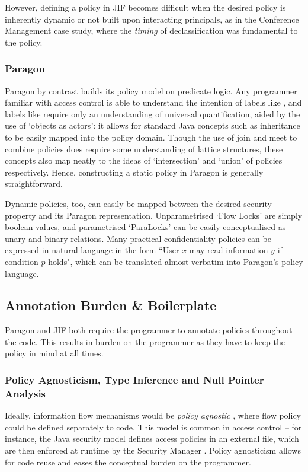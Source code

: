 However, defining a policy in JIF becomes difficult when the desired policy is inherently dynamic or not built upon interacting principals, as in the Conference Management case study, where the \textit{timing} of declassification was fundamental to the policy.

\subsubsection{Paragon}

Paragon by contrast builds its policy model on predicate logic. Any programmer familiar with access control is able to understand the intention of labels like , and labels like  require only an understanding of universal quantification, aided by the use of `objects as actors': it allows for standard Java concepts such as inheritance to be easily mapped into the policy domain. Though the use of join and meet to combine policies does require some understanding of lattice structures, these concepts also map neatly to the ideas of `intersection' and `union' of policies respectively. Hence, constructing a static policy in Paragon is generally straightforward.

Dynamic policies, too, can easily be mapped between the desired security property and its Paragon representation. Unparametrised `Flow Locks' are simply boolean values, and parametrised `ParaLocks' can be easily conceptualised as unary and binary relations. Many practical confidentiality policies can be expressed in natural language in the form ``User $ x $ may read information $ y $ if condition $ p $ holds", which can be translated almost verbatim into Paragon's policy language.

\subsection{Annotation Burden \& Boilerplate}

Paragon and JIF both require the programmer to annotate policies throughout the code. This results in burden on the programmer as they have to keep the policy in mind at all times.

\subsubsection{Policy Agnosticism, Type Inference and Null Pointer Analysis}

Ideally, information flow mechanisms would be \textit{policy agnostic} \cite{yang2012agnostic} \cite{austin2013agnostic}, where flow policy could be defined separately to code. This model is common in access control -- for instance, the Java security model defines access policies in an external file, which are then enforced at runtime by the Security Manager \cite{gong2003javasecurity}. Policy agnosticism allows for code reuse and eases the conceptual burden on the programmer.

